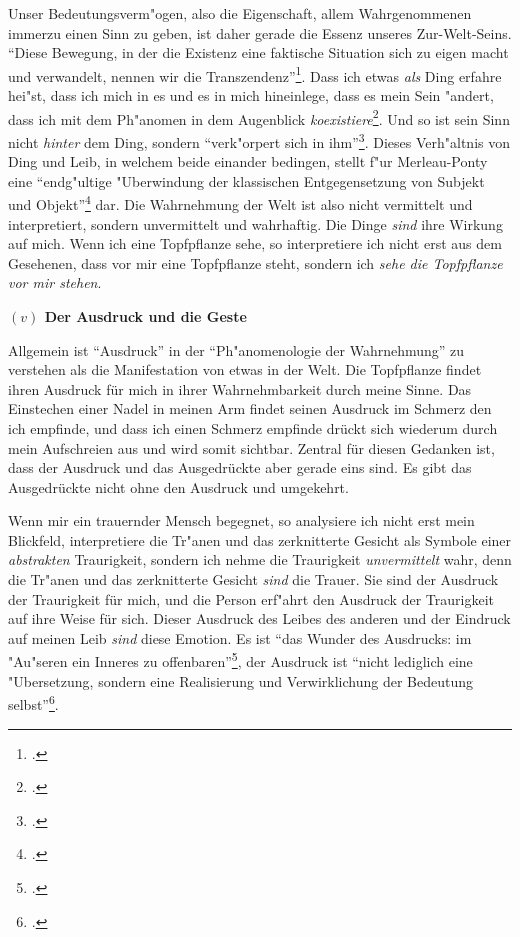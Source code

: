 \documentclass[a4paper, 12pt]{article}
\begin{document}
\begin{onehalfspace}
Unser Bedeutungsverm"ogen, also die Eigenschaft, allem Wahrgenommenen immerzu einen Sinn zu geben, ist daher gerade die Essenz unseres Zur-Welt-Seins. "`Diese Bewegung, in der die Existenz eine faktische Situation sich zu eigen macht und verwandelt, nennen wir die Transzendenz"'\footnote{\Cite[Siehe][S. 202]{merleau1966phanomenologie}.}. Dass ich etwas \emph{als} Ding erfahre hei"st, dass ich mich in es und es in mich hineinlege, dass es mein Sein "andert, dass ich mit dem Ph"anomen in dem Augenblick \emph{koexistiere}\footnote{\Cite[Vgl.][S. 368]{merleau1966phanomenologie}.}. Und so ist sein Sinn nicht \emph{hinter} dem Ding, sondern "`verk"orpert sich in ihm"'\footnote{\Cite[Siehe][S. 370]{merleau1966phanomenologie}.}. Dieses Verh"altnis von Ding und Leib, in welchem beide einander bedingen, stellt f"ur Merleau-Ponty eine "`endg"ultige "Uberwindung der klassischen Entgegensetzung von Subjekt und Objekt"'\footnote{\Cite[Siehe][S. 207]{merleau1966phanomenologie}.} dar. Die Wahrnehmung der Welt ist also nicht vermittelt und interpretiert, sondern unvermittelt und wahrhaftig. Die Dinge \emph{sind} ihre Wirkung auf mich. Wenn ich eine Topfpflanze sehe, so interpretiere ich nicht erst aus dem Gesehenen, dass vor mir eine Topfpflanze steht, sondern ich \emph{sehe die Topfpflanze vor mir stehen}.

\vspace{5mm}

\noindent\textbf{$(v)$ Der Ausdruck und die Geste}

\noindent Allgemein ist "`Ausdruck"' in der "`Ph"anomenologie der Wahrnehmung"' zu verstehen als die Manifestation von etwas in der Welt. Die Topfpflanze findet ihren Ausdruck für mich in ihrer Wahrnehmbarkeit durch meine Sinne. Das Einstechen einer Nadel in meinen Arm findet seinen Ausdruck im Schmerz den ich empfinde, und dass ich einen Schmerz empfinde drückt sich wiederum durch mein Aufschreien aus und wird somit sichtbar. Zentral für diesen Gedanken ist, dass der Ausdruck und das Ausgedrückte aber gerade eins sind. Es gibt das Ausgedrückte nicht ohne den Ausdruck und umgekehrt. 

Wenn mir ein trauernder Mensch begegnet, so analysiere ich nicht erst mein Blickfeld, interpretiere die Tr"anen und das zerknitterte Gesicht als Symbole einer \emph{abstrakten} Traurigkeit, sondern ich nehme die Traurigkeit \emph{unvermittelt} wahr, denn die Tr"anen und das zerknitterte Gesicht \emph{sind} die Trauer. Sie sind der Ausdruck der Traurigkeit für mich, und die Person erf"ahrt den Ausdruck der Traurigkeit auf ihre Weise für sich. Dieser Ausdruck des Leibes des anderen und der Eindruck auf meinen Leib \emph{sind} diese Emotion. Es ist "`das Wunder des Ausdrucks: im "Au"seren ein Inneres zu offenbaren"'\footnote{\Cite[Siehe][S. 370]{merleau1966phanomenologie}.}, der Ausdruck ist "`nicht lediglich eine "Ubersetzung, sondern eine Realisierung und Verwirklichung der Bedeutung selbst"'\footnote{\Cite[Siehe][S. 217]{merleau1966phanomenologie}.}. 


\end{onehalfspace}
\end{document}
